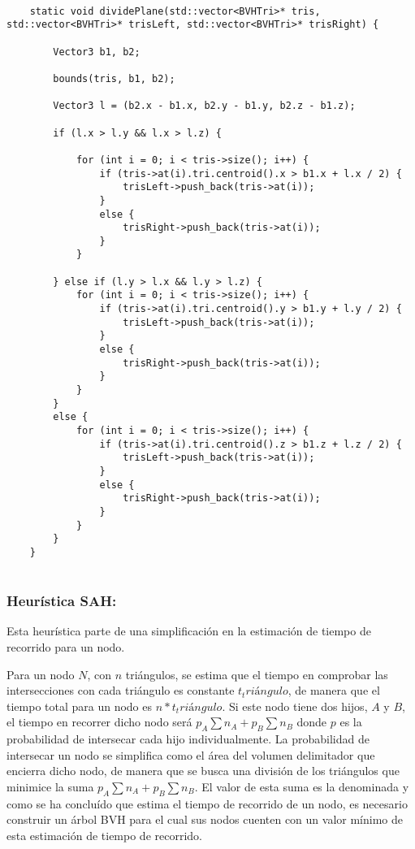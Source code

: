 \begin{minipage}[c]{0.95\textwidth}
\begin{lstlisting}[label={cod:planeheuristic}, caption={Heurística de división de plano}]
	
	static void dividePlane(std::vector<BVHTri>* tris, std::vector<BVHTri>* trisLeft, std::vector<BVHTri>* trisRight) {

		Vector3 b1, b2;

		bounds(tris, b1, b2);

		Vector3 l = (b2.x - b1.x, b2.y - b1.y, b2.z - b1.z);

		if (l.x > l.y && l.x > l.z) {

			for (int i = 0; i < tris->size(); i++) {
				if (tris->at(i).tri.centroid().x > b1.x + l.x / 2) {
					trisLeft->push_back(tris->at(i));
				}
				else {
					trisRight->push_back(tris->at(i));
				}
			}

		} else if (l.y > l.x && l.y > l.z) {
			for (int i = 0; i < tris->size(); i++) {
				if (tris->at(i).tri.centroid().y > b1.y + l.y / 2) {
					trisLeft->push_back(tris->at(i));
				}
				else {
					trisRight->push_back(tris->at(i));
				}
			}
		}
		else {
			for (int i = 0; i < tris->size(); i++) {
				if (tris->at(i).tri.centroid().z > b1.z + l.z / 2) {
					trisLeft->push_back(tris->at(i));
				}
				else {
					trisRight->push_back(tris->at(i));
				}
			}
		}
	}
	
\end{lstlisting}
\end{minipage}

\subsubsection{Heurística SAH:}
\label{sub:sah}	

Esta heurística parte de una simplificación en la estimación de tiempo de recorrido para un nodo.

Para un nodo $N$, con $n$ triángulos, se estima que el tiempo en comprobar las intersecciones con cada triángulo es constante $t_triángulo$, de manera que el tiempo total para un nodo es $n * t_triángulo$. Si este nodo tiene dos hijos, $A$ y $B$, el tiempo en recorrer dicho nodo será $p_A\sum{n_A} + p_B\sum{n_B}$ donde $p$ es la probabilidad de intersecar cada hijo individualmente. La probabilidad de intersecar un nodo se simplifica como el área del volumen delimitador que encierra dicho nodo, de manera que se busca una división de los triángulos que minimice la suma $p_A\sum{n_A} + p_B\sum{n_B}$. El valor de esta suma es la denominada  y como se ha concluído que estima el tiempo de recorrido de un nodo, es necesario construir un árbol BVH para el cual sus nodos cuenten con un valor mínimo de esta estimación de tiempo de recorrido.

